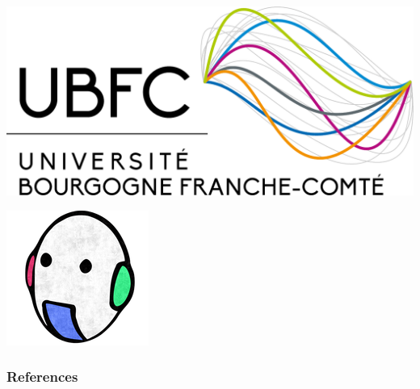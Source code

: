 \documentclass[9pt, aspectratio=169]{beamer}
\begin{document}
\begin{frame}[plain,c]
\begin{minipage}{0.49\textwidth}
{	\begin{minipage}{0.45\linewidth}
			\centering
			\includegraphics[width=0.7\linewidth]{images/logos/ubfc}
	\end{minipage}\hfill
	\begin{minipage}{0.45\linewidth}
			\centering
			\includegraphics[width=0.5\linewidth]{images/logos/vibot}	
	\end{minipage}
	}
	\end{minipage}
\end{frame}






\begin{frame}
\frametitle{References}

\scriptsize{}

\end{frame}

\appendix
\end{document}
